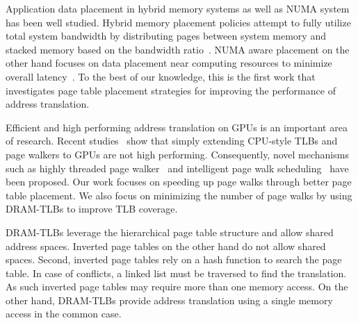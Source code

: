  Application data
placement in hybrid memory systems as well as NUMA system has been
well studied. Hybrid memory placement policies attempt to fully
utilize total system bandwidth by distributing pages between system
memory and stacked memory based on the bandwidth
ratio~\cite{bwa,batman}. NUMA aware placement on the other hand
focuses on data placement near computing resources to minimize overall
latency~\cite{numa-traffic, numa-OSsupport, numa-bolosky}. To the best
of our knowledge, this is the first work that investigates page table
placement strategies for improving the performance of address
translation.

 Efficient and high
performing address translation on GPUs is an important area of
research. Recent studies~\cite{power2014supporting, pichaigpu} show
that simply extending CPU-style TLBs and page walkers to GPUs are not
high performing. Consequently, novel mechanisms such as highly
threaded page walker~\cite{power2014supporting} and intelligent page
walk scheduling~\cite{pichaigpu} have been proposed. Our work focuses
on speeding up page walks through better page table placement. We also
focus on minimizing the number of page walks by using DRAM-TLBs to
improve TLB coverage.

 DRAM-TLBs leverage the hierarchical
page table structure and allow shared address spaces. Inverted page
tables on the other hand do not allow shared spaces. Second, inverted
page tables rely on a hash function to search the page table. In case
of conflicts, a linked list must be traversed to find the translation.
As such inverted page tables may require more than one memory access.
On the other hand, DRAM-TLBs provide address translation using a
single memory access in the common case.


% 
% 
